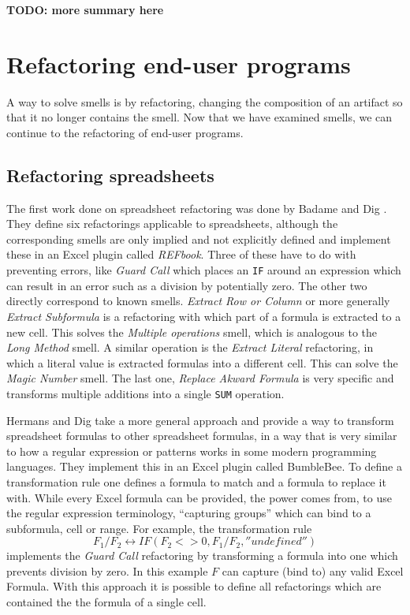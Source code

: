 \documentclass[10pt,conference,compsocconf]{IEEEtran}
\newcommand{\todo}[1]{\textbf{TODO: #1}}
\begin{document}
\todo{more summary here}

\section{Refactoring end-user programs}
\label{sec:refactoring}

A way to solve smells is by refactoring, changing the composition of an artifact so that it no longer contains the smell.
Now that we have examined smells, we can continue to the refactoring of end-user programs.

\subsection{Refactoring spreadsheets}

The first work done on spreadsheet refactoring was done by Badame and Dig \cite{badame2012refactoring}. They define six refactorings applicable to spreadsheets, although the corresponding smells are only implied and not explicitly defined and implement these in an Excel plugin called \textit{REFbook}. Three of these have to do with preventing errors, like \textit{Guard Call} which places an \texttt{IF} around an expression which can result in an error such as a division by potentially zero. The other two directly correspond to known smells. \textit{Extract Row or Column} or more generally \textit{Extract Subformula} is a refactoring with which part of a formula is extracted to a new cell. This solves the \textit{Multiple operations} smell, which is analogous to the \textit{Long Method} \cite{Hermans2012intra} smell. A similar operation is the \textit{Extract Literal} refactoring, in which a literal value is extracted formulas into a different cell. This can solve the \textit{Magic Number} smell.
The last one, \textit{Replace Akward Formula} is very specific and transforms multiple additions into a single \texttt{SUM} operation.

Hermans and Dig \cite{hermans2014bumblebee} take a more general approach and provide a way to transform spreadsheet formulas to other spreadsheet formulas, in a way that is very similar to how a regular expression or patterns works in some modern programming languages.
They implement this in an Excel plugin called BumbleBee.
To define a transformation rule one defines a formula to match and a formula to replace it with. While every Excel formula can be provided, the power comes from, to use the regular expression terminology, ``capturing groups'' which can bind to a subformula, cell or range. For example, the transformation rule
\[F_1/F_2 \leftrightarrow IF(F_2<>0,F_1/F_2,''undefined'')\]
 implements the \textit{Guard Call} refactoring by transforming a formula into one which prevents division by zero.
 In this example $F$ can capture (bind to) any valid Excel Formula.
 With this approach it is possible to define all refactorings which are contained the the formula of a single cell.
\end{document}
